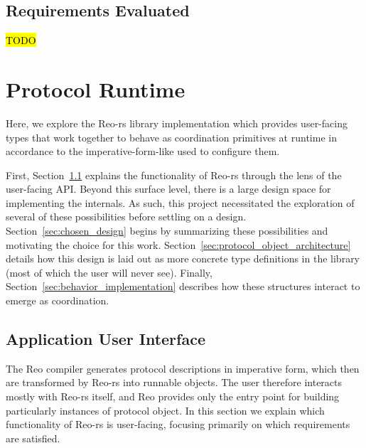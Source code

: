\subsection{Requirements Evaluated}
\hl{TODO}

\section{Protocol Runtime}
\label{sec:protocol_runtime}
Here, we explore the Reo-rs library implementation which provides user-facing types that work together to behave as coordination primitives at runtime in accordance to the imperative-form-like  used to configure them.

First, Section~\ref{sec:user_facing} explains the functionality of Reo-rs through the lens of the user-facing API. Beyond this surface level, there is a large design space for implementing the internals. As such, this project necessitated the exploration of several of these possibilities before settling on a design. Section~\ref{sec:chosen_design} begins by summarizing these possibilities and motivating the choice for this work. Section~\ref{sec:protocol_object_architecture} details how this design is laid out as more concrete type definitions in the library (most of which the user will never see). Finally, Section~\ref{sec:behavior_implementation} describes how these structures interact to emerge as coordination.

\subsection{Application User Interface}
\label{sec:user_facing}
The Reo compiler generates protocol descriptions in imperative form, which then are transformed by Reo-rs into runnable objects. The user therefore interacts mostly with Reo-rs itself, and Reo provides only the entry point for building particularly instances of protocol object. In this section we explain which functionality of Reo-rs is user-facing, focusing primarily on which requirements are satisfied.


